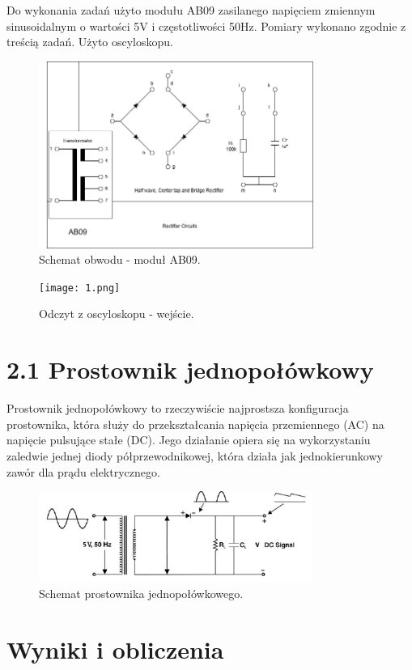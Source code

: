\documentclass[a4paper,12pt]{article}
\begin{document}
Do wykonania zadań użyto modułu AB09 zasilanego napięciem zmiennym sinusoidalnym o wartości 5V i częstotliwości 50Hz. Pomiary wykonano zgodnie z treścią zadań. Użyto oscyloskopu.
\begin{figure}[h]
    \centering
    \includegraphics[width=0.8\textwidth]{AB09.png}
    \caption{Schemat obwodu - moduł AB09.}
    \label{fig:schemat}
\end{figure}
\begin{figure}[h]
    \centering
    \texttt{[image: 1.png]}
    \caption{Odczyt z oscyloskopu - wejście.}
    \label{fig:schemat}
\end{figure}
\section*{2.1 Prostownik jednopołówkowy}
Prostownik jednopołówkowy to rzeczywiście najprostsza konfiguracja prostownika, która służy do przekształcania napięcia przemiennego (AC) na napięcie pulsujące stałe (DC). Jego działanie opiera się na wykorzystaniu zaledwie jednej diody półprzewodnikowej, która działa jak jednokierunkowy zawór dla prądu elektrycznego.
\begin{figure}[h]
    \centering
    \includegraphics[width=0.8\textwidth]{2.png}
    \caption{Schemat prostownika jednopołówkowego.}
    \label{fig:schemat}
\end{figure}
\section*{Wyniki i obliczenia}
\end{document}
